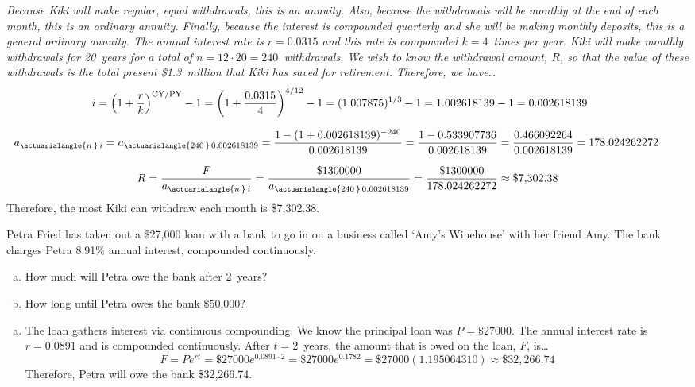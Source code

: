 \documentclass[12pt,letterpaper]{exam}
\begin{document}
\begin{questions}
{\itshape 
\sol Because Kiki will make regular, equal withdrawals, this is an annuity. Also, because the withdrawals will be monthly at the end of each month, this is an ordinary annuity. Finally, because the interest is compounded quarterly and she will be making monthly deposits, this is a general ordinary annuity. The annual interest rate is $r= 0.0315$ and this rate is compounded $k= 4$~times per year. Kiki will make monthly withdrawals for 20~years for a total of $n= 12 \cdot 20= 240$~withdrawals. We wish to know the withdrawal amount, $R$, so that the value of these withdrawals is the total present \$1.3~million that Kiki has saved for retirement. Therefore, we have\dots
	\[
	\hspace{-0.5cm} i= \left(1 + \dfrac{r}{k} \right)^{\text{CY}/\text{PY}} - 1= \left(1 + \dfrac{0.0315}{4} \right)^{4/12} - 1= (1.007875)^{1/3} - 1= 1.002618139 - 1= 0.002618139
	\] \par\vspace{0.1cm}
	\[
	\hspace{-0.75cm} a_{\actuarialangle{n\,}\, i}= a_{\actuarialangle{240\,}\, 0.002618139}= \dfrac{1 - (1 + 0.002618139)^{-240}}{0.002618139}= \dfrac{1 - 0.533907736}{0.002618139}= \dfrac{0.466092264}{0.002618139}= 178.024262272
	\] \par\vspace{0.1cm}
	\[
	R= \dfrac{F}{a_{\actuarialangle{n\,}\, i}}= \dfrac{\$1300000}{a_{\actuarialangle{240\,}\, 0.002618139}}= \dfrac{\$1300000}{178.024262272} \approx \$7,\!302.38
	\] \pspace
Therefore, the most Kiki can withdraw each month is \$7,302.38. 
}




\newpage
\question[10] Petra Fried has taken out a \$27,000 loan with a bank to go in on a business called `Amy's Winehouse' with her friend Amy. The bank charges Petra 8.91\% annual interest, compounded continuously. 
	\begin{enumerate}[(a)]
	\item How much will Petra owe the bank after 2~years?
	\item How long until Petra owes the bank \$50,000? 
	\end{enumerate} \pspace

{\itshape
\sol 
\begin{enumerate}[(a)]
\item The loan gathers interest via continuous compounding. We know the principal loan was $P= \$27000$. The annual interest rate is $r= 0.0891$ and is compounded continuously. After $t= 2$~years, the amount that is owed on the loan, $F$, is\dots
	\[
	F= Pe^{rt}= \$27000 e^{0.0891 \cdot 2}= \$27000 e^{0.1782}= \$27000 (1.195064310) \approx \$32,\!266.74
	\]
Therefore, Petra will owe the bank \$32,266.74. \pspace


\end{enumerate}}
\end{questions}
\end{document}
